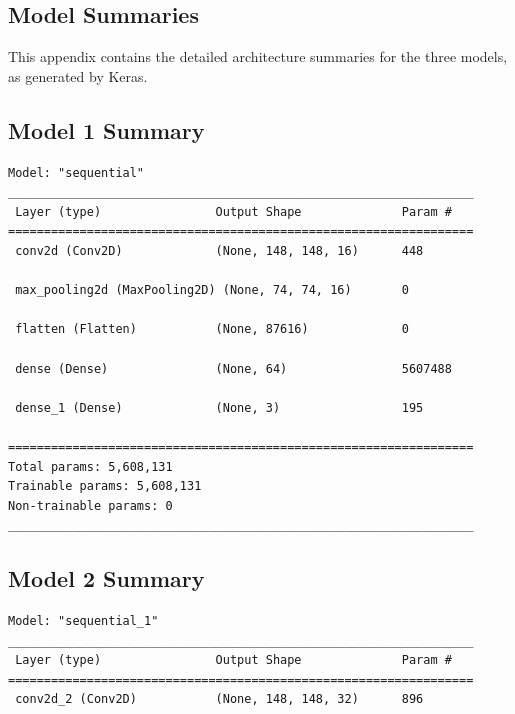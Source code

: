 \documentclass[pdflatex,sn-mathphys-num]{sn-jnl}%
\theoremstyle{thmstyleone}%
\theoremstyle{thmstyletwo}%
\theoremstyle{thmstylethree}%
\begin{document}
\begin{appendices}

\section{Model Summaries}\label{secA1}

This appendix contains the detailed architecture summaries for the three models, as generated by Keras.

\subsection{Model 1 Summary}
\begin{verbatim}
Model: "sequential"
_________________________________________________________________
 Layer (type)                Output Shape              Param #   
=================================================================
 conv2d (Conv2D)             (None, 148, 148, 16)      448       
                                                                 
 max_pooling2d (MaxPooling2D) (None, 74, 74, 16)       0         
                                                                 
 flatten (Flatten)           (None, 87616)             0         
                                                                 
 dense (Dense)               (None, 64)                5607488   
                                                                 
 dense_1 (Dense)             (None, 3)                 195       
                                                                 
=================================================================
Total params: 5,608,131
Trainable params: 5,608,131
Non-trainable params: 0
_________________________________________________________________
\end{verbatim}

\subsection{Model 2 Summary}
\begin{verbatim}
Model: "sequential_1"
_________________________________________________________________
 Layer (type)                Output Shape              Param #   
=================================================================
 conv2d_2 (Conv2D)           (None, 148, 148, 32)      896       
                                                                 

\end{verbatim}
\end{appendices}
\end{document}
